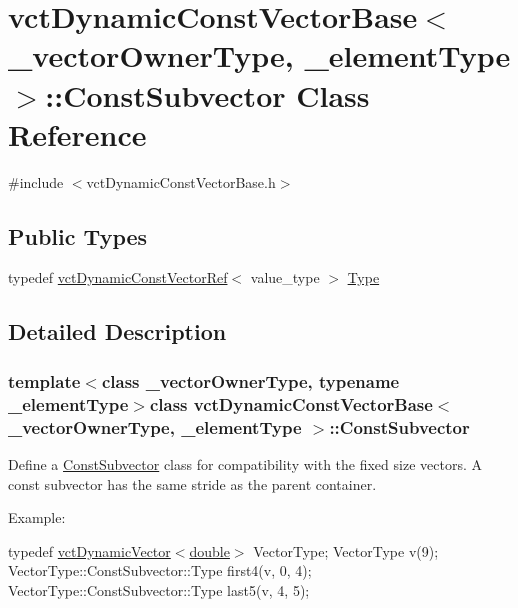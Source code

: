 \hypertarget{classvct_dynamic_const_vector_base_1_1_const_subvector}{}\section{vct\+Dynamic\+Const\+Vector\+Base$<$ \+\_\+vector\+Owner\+Type, \+\_\+element\+Type $>$\+:\+:Const\+Subvector Class Reference}
\label{classvct_dynamic_const_vector_base_1_1_const_subvector}


{\ttfamily \#include $<$vct\+Dynamic\+Const\+Vector\+Base.\+h$>$}

\subsection*{Public Types}
\begin{DoxyCompactItemize}
\item 
typedef \hyperlink{classvct_dynamic_const_vector_ref}{vct\+Dynamic\+Const\+Vector\+Ref}$<$ value\+\_\+type $>$ \hyperlink{classvct_dynamic_const_vector_base_1_1_const_subvector_adbf4a3fe950a5909deb939cffbb7d9a5}{Type}
\end{DoxyCompactItemize}


\subsection{Detailed Description}
\subsubsection*{template$<$class \+\_\+vector\+Owner\+Type, typename \+\_\+element\+Type$>$class vct\+Dynamic\+Const\+Vector\+Base$<$ \+\_\+vector\+Owner\+Type, \+\_\+element\+Type $>$\+::\+Const\+Subvector}

Define a \hyperlink{classvct_dynamic_const_vector_base_1_1_const_subvector}{Const\+Subvector} class for compatibility with the fixed size vectors. A const subvector has the same stride as the parent container.

Example\+:

typedef \hyperlink{classvct_dynamic_vector}{vct\+Dynamic\+Vector$<$double$>$} Vector\+Type; Vector\+Type v(9); Vector\+Type\+::\+Const\+Subvector\+::\+Type first4(v, 0, 4); Vector\+Type\+::\+Const\+Subvector\+::\+Type last5(v, 4, 5);

